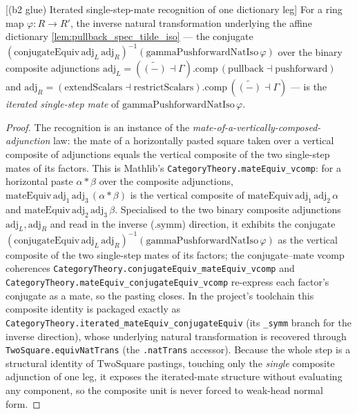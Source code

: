 \begin{lemma}

[(b2 glue) Iterated single-step-mate recognition of one dictionary leg]
  \label{lem:ring_square_glue_pst_iterated_mate}
  For a ring map \(\varphi : R \to R'\), the inverse natural transformation underlying the affine
  dictionary \cref{lem:pullback_spec_tilde_iso} --- the conjugate
  \((\mathrm{conjugateEquiv}\,\mathrm{adj}_L\,\mathrm{adj}_R)^{-1}(\mathrm{gammaPushforwardNatIso}\,\varphi)\)
  over the binary composite adjunctions
  \(\mathrm{adj}_L = (\widetilde{(-)}\dashv\Gamma).\mathrm{comp}\,(\mathrm{pullback}\dashv\mathrm{pushforward})\)
  and
  \(\mathrm{adj}_R = (\mathrm{extendScalars}\dashv\mathrm{restrictScalars}).\mathrm{comp}\,(\widetilde{(-)}\dashv\Gamma)\)
  --- is the \emph{iterated single-step mate} of \(\mathrm{gammaPushforwardNatIso}\,\varphi\).
  \begin{proof}
    The recognition is an instance of the \emph{mate-of-a-vertically-composed-adjunction} law: the mate
    of a horizontally pasted square taken over a vertical composite of adjunctions equals the vertical
    composite of the two single-step mates of its factors. This is Mathlib's
    \texttt{CategoryTheory.mateEquiv\_vcomp}: for a horizontal paste \(\alpha \ast \beta\) over the
    composite adjunctions, \(\mathrm{mateEquiv}\,\mathrm{adj}_1\,\mathrm{adj}_3\,(\alpha \ast \beta)\)
    is the vertical composite of \(\mathrm{mateEquiv}\,\mathrm{adj}_1\,\mathrm{adj}_2\,\alpha\) and
    \(\mathrm{mateEquiv}\,\mathrm{adj}_2\,\mathrm{adj}_3\,\beta\). Specialised to the two binary
    composite adjunctions \(\mathrm{adj}_L,\mathrm{adj}_R\) and read in the inverse (\(\mathrm{.symm}\))
    direction, it exhibits the conjugate
    \((\mathrm{conjugateEquiv}\,\mathrm{adj}_L\,\mathrm{adj}_R)^{-1}(\mathrm{gammaPushforwardNatIso}\,\varphi)\)
    as the vertical composite of the two single-step mates of its factors; the conjugate--mate vcomp
    coherences \texttt{CategoryTheory.conjugateEquiv\_mateEquiv\_vcomp} and
    \texttt{CategoryTheory.mateEquiv\_conjugateEquiv\_vcomp} re-express each factor's conjugate as a
    mate, so the pasting closes. In the project's toolchain this composite identity is packaged exactly
    as \texttt{CategoryTheory.iterated\_mateEquiv\_conjugateEquiv} (its \texttt{\_symm} branch for the
    inverse direction), whose underlying natural transformation is recovered through
    \texttt{TwoSquare.equivNatTrans} (the \texttt{.natTrans} accessor). Because the whole step is a
    structural identity of \(\mathrm{TwoSquare}\) pastings, touching only the \emph{single} composite
    adjunction of one leg, it exposes the iterated-mate structure without evaluating any component, so
    the composite unit is never forced to weak-head normal form.
  \end{proof}
\end{lemma}

